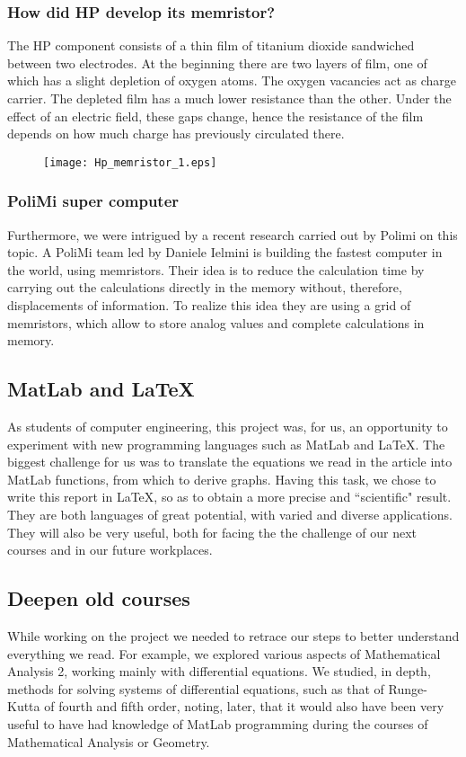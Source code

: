 \documentclass[12pt, a4paper]{paper}
\begin{document}
\subsubsection{How did HP develop its memristor?}
The HP component consists of a thin film of titanium dioxide sandwiched between two electrodes.
At the beginning there are two layers of film, one of which has a slight depletion of oxygen atoms. The oxygen vacancies act as charge carrier. The depleted film has a much lower resistance than the other. 
Under the effect of an electric field,  these gaps change, hence the resistance of the film depends on how much charge has previously circulated there.

\begin{figure}[h]
\centering
\texttt{[image: Hp\_memristor\_1.eps]}
\end{figure}

\subsubsection{PoliMi super computer}
Furthermore, we were intrigued by a recent research carried out by Polimi on this topic.
A PoliMi team led by Daniele Ielmini is building the fastest computer in the world, using memristors.
Their idea is to reduce the calculation time by carrying out the calculations directly in the memory
without, therefore, displacements of information.
To realize this idea they are using a grid of memristors, which allow to store analog values and complete calculations in memory.

\subsection{MatLab and LaTeX}
As students of computer engineering, this project was, for us, an opportunity to
experiment with new programming languages such as MatLab and LaTeX.
The biggest challenge for us was to translate the equations we read in the article into  MatLab functions, from which to derive graphs.
Having this task,  we chose to write this report in LaTeX, so as to obtain a 
more precise and “scientific" result.
They are both languages of great potential, with varied and diverse applications.
They will also be very useful, both for facing the the challenge of our next courses and in our future workplaces.

\subsection{Deepen old courses}
While working on the project we needed to retrace our steps to better understand
everything we read. For example,  we explored various aspects of Mathematical Analysis 2, working  mainly with differential equations.
We studied, in depth, methods for solving systems of differential equations, such as
that of Runge-Kutta of fourth and fifth order, noting, later, that it would also have been very useful
to have had knowledge of MatLab programming during the courses of  Mathematical Analysis or Geometry.
\end{document}
